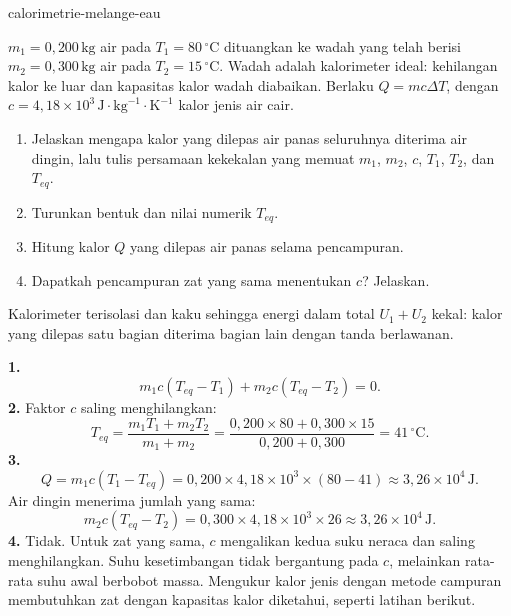 \begin{exo}{calorimetrie-melange-eau}

$m_1=0{,}200\,\text{kg}$ air pada $T_1=80\,^\circ\text{C}$ dituangkan ke wadah yang telah berisi $m_2=0{,}300\,\text{kg}$ air pada $T_2=15\,^\circ\text{C}$. Wadah adalah kalorimeter ideal: kehilangan kalor ke luar dan kapasitas kalor wadah diabaikan. Berlaku $Q=mc\Delta T$, dengan $c=4{,}18\times10^3\,\text{J}\!\cdot\!\text{kg}^{-1}\!\cdot\!\text{K}^{-1}$ kalor jenis air cair.
\begin{enumerate}
  \item Jelaskan mengapa kalor yang dilepas air panas seluruhnya diterima air dingin, lalu tulis persamaan kekekalan yang memuat $m_1$, $m_2$, $c$, $T_1$, $T_2$, dan $T_{eq}$.
  \item Turunkan bentuk dan nilai numerik $T_{eq}$.
  \item Hitung kalor $Q$ yang dilepas air panas selama pencampuran.
  \item Dapatkah pencampuran zat yang sama menentukan $c$? Jelaskan.
\end{enumerate}
\begin{indication}
Kalorimeter terisolasi dan kaku sehingga energi dalam total $U_1+U_2$ kekal: kalor yang dilepas satu bagian diterima bagian lain dengan tanda berlawanan.
\end{indication}
\begin{solution}
\textbf{1.}
\[
m_1c(T_{eq}-T_1)+m_2c(T_{eq}-T_2)=0.
\]
\textbf{2.} Faktor $c$ saling menghilangkan:
\[
T_{eq}=\frac{m_1T_1+m_2T_2}{m_1+m_2}
=\frac{0{,}200\times80+0{,}300\times15}{0{,}200+0{,}300}=41\,^\circ\text{C}.
\]
\textbf{3.}
\[
Q=m_1c(T_1-T_{eq})=0{,}200\times4{,}18\times10^3\times(80-41)
\approx3{,}26\times10^4\,\text{J}.
\]
Air dingin menerima jumlah yang sama:
\[
m_2c(T_{eq}-T_2)=0{,}300\times4{,}18\times10^3\times26
\approx3{,}26\times10^4\,\text{J}.
\]
\textbf{4.} Tidak. Untuk zat yang sama, $c$ mengalikan kedua suku neraca dan saling menghilangkan. Suhu kesetimbangan tidak bergantung pada $c$, melainkan rata-rata suhu awal berbobot massa. Mengukur kalor jenis dengan metode campuran membutuhkan zat dengan kapasitas kalor diketahui, seperti latihan berikut.
\end{solution}
\end{exo}

